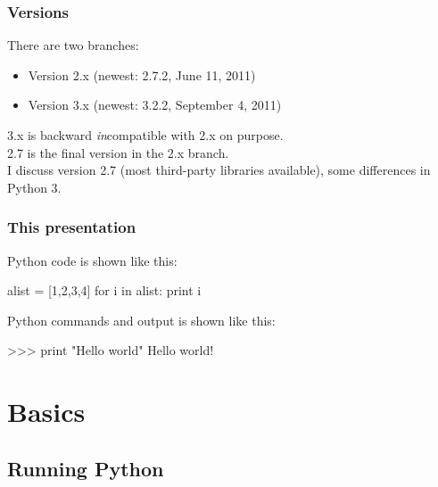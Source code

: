 \documentclass[xetex,10pt]{beamer}
\def\spacer{\vspace*{1em}}
\begin{document}
\begin{frame}
	\frametitle{Versions}
	
	There are two branches:
	
	\begin{itemize}
	\item Version 2.x (newest: 2.7.2, June 11, 2011)
	\item Version 3.x (newest: 3.2.2, September 4, 2011)
	\end{itemize}
	
	3.x is backward \emph{in}compatible with 2.x on purpose.\\
	2.7 is the final version in the 2.x branch.\\[2em]
	
	I discuss version 2.7 (most third-party libraries available), some differences in Python 3.
	
\end{frame}

\begin{frame}[fragile]
	\frametitle{This presentation}
	
	Python code is shown like this:
\begin{python}
alist = [1,2,3,4]
for i in alist:
    print i
\end{python}
	
	\spacer
	
	Python commands and output is shown like this:

\begin{python}
>>> print "Hello world"
Hello world!
\end{python}

\end{frame}


\section{Basics}

\subsection{Running Python}
\end{document}
